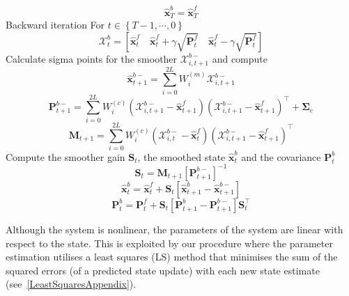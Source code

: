 \documentclass[12pt]{iopart}		%
\begin{document}
\begin{algorithm}
\begin{algorithmic}[1]
\begin{equation}
\hat{\mathbf x}^b_T= \hat{\mathbf x}^f_T
\end{equation}
\State Backward iteration
For $t \in \left\lbrace T-1, \cdots, 0 \right\rbrace $
\begin{equation*}
\mathcal X_t^b=[\hat{\mathbf x}_t^f \quad \hat{\mathbf x}_t^f+\gamma\sqrt{\mathbf P_t^f} \quad \hat{\mathbf x}_t^f-\gamma\sqrt{\mathbf P_t^f}]
\end{equation*}
\State Calculate sigma points for the smoother $\mathcal X_{i,t+1}^{b-}$ and compute
\begin{equation*}
 \hat{\mathbf x}_{t+1}^{b-}=\sum_{i=0}^{2L} W_i^{(m)}\mathcal X_{i,t+1}^{b-}
\end{equation*}
\begin{equation*}
 \mathbf P_{t +1}^{b-}=\sum_{i=0}^{2L} W_i^{(c)}(\mathcal X_{i,t+1}^{b-}-\hat{\mathbf x}_{t +1}^{f})(\mathcal X_{i,t+1}^{b-}-\hat{\mathbf x}_{t +1}^{f})^\top+\boldsymbol \Sigma_e
\end{equation*}
\begin{equation*}
 \mathbf M_{t +1}=\sum_{i=0}^{2L} W_i^{(c)}(\mathcal X_{i,t}^{b-}-\hat{\mathbf x}_{t}^{f})(\mathcal X_{i,t+1}^{b-}-\hat{\mathbf x}_{t+1}^{f})^\top
\end{equation*}
\State Compute the smoother gain $\mathbf S_t$, the smoothed state $\hat{\mathbf x}_t^b $ and the covariance $\mathbf P_{t}^{b} $
\begin{equation*}
\mathbf S_t=\mathbf M_{t +1}\left[ \mathbf P_{t +1}^{b-}\right] ^{-1}
\end{equation*}
\begin{equation*}
 \hat{\mathbf x}_t^b=\hat{\mathbf x}_t^f+\mathbf S_t\left[\hat{\mathbf x}_{t+1}^{b}-\hat{\mathbf x}_{t+1}^{b-}\right] 
\end{equation*}
\begin{equation*}
 \mathbf P_{t}^{b}=\mathbf P_{t}^{f}+\mathbf S_t\left[\mathbf P_{t+1}^{b}-\mathbf P_{t+1}^{b-} \right]\mathbf S_t^\top 
\end{equation*}
\end{algorithmic}
\end{algorithm}

Although the system is nonlinear, the parameters of the system are linear with respect to the state. This is exploited by our procedure where the parameter estimation utilises a least squares (LS) method that minimises the sum of the squared errors (of a predicted state update) with each new state estimate (see~\ref{LeastSquaresAppendix}).
\end{document}
